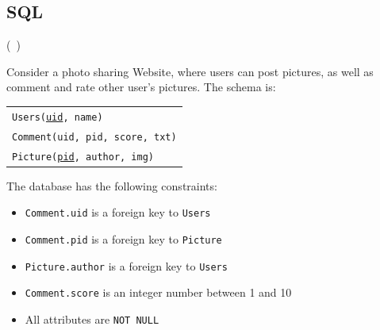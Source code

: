 \documentclass[addpoints,answers,12pt]{exam}
\newcommand{\eat}[1]{}
\begin{document}
\begin{questions}
\section{SQL}

\question (\totalpoints\ \points) 

Consider a photo sharing Website, where users can post pictures, as
well as comment and rate other user's pictures.  The schema is:

\begin{tabular}{l}
  \texttt{Users(\underline{uid}, name)} \\
  \texttt{Comment(uid, pid, score, txt)} \\
  \texttt{Picture(\underline{pid}, author, img)}
\end{tabular}

\eat{

-- if needed:
drop table comment; drop table picture; drop table users;

create table users(uid int primary key, name varchar(20));
create table picture(pid int primary key, author int references users, img varchar(10));
create table comment(uid int references users, pid int references picture, score int, txt varchar(30));

insert into users values(1,'Alice');
insert into users values(2,'Bob');
insert into users values(3,'Carol');

insert into picture values(100,1,'img1');
insert into picture values(200,1,'img2');
insert into picture values(300,1,'img3');
insert into picture values(400,2,'img4');

insert into comment values(1,400,8,'abc');
insert into comment values(3,100,8,'def');
insert into comment values(3,200,8,'hhk');
insert into comment values(3,400,8,'lmn');
}


The database has the following constraints:

\begin{itemize}
\item \texttt{Comment.uid} is a foreign key to \texttt{Users}
\item \texttt{Comment.pid} is a foreign key to \texttt{Picture}
\item \texttt{Picture.author} is a foreign key to \texttt{Users}
\item \texttt{Comment.score} is an integer number between 1 and 10
\item All attributes are \texttt{NOT NULL}
\end{itemize}


\end{questions}
\end{document}
